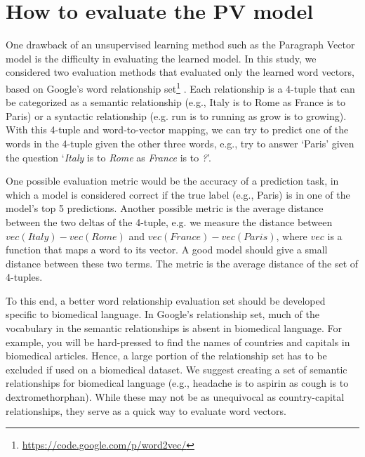 \documentclass{article}
\begin{document}
\section*{How to evaluate the PV model}

One drawback of an unsupervised learning method such as the Paragraph Vector model is the difficulty in evaluating the learned model. In this study, we considered two evaluation methods that evaluated only the learned word vectors, based on Google's word relationship set\footnote{\url{https://code.google.com/p/word2vec/}} \autocite{mikolov2013efficient}. Each relationship is a 4-tuple that can be categorized as a semantic relationship (e.g., Italy is to Rome as France is to Paris) or a syntactic relationship (e.g. run is to running as grow is to growing). With this 4-tuple and word-to-vector mapping, we can try to predict one of the words in the 4-tuple given the other three words, e.g., try to answer `Paris' given the question `{\it Italy} is to {\it Rome} as {\it France} is to {\it ?}'.

One possible evaluation metric would be the accuracy of a prediction task, in which a model is considered correct if the true label (e.g., Paris) is in one of the model's top 5 predictions.  Another possible metric is the average distance between the two deltas of the 4-tuple, e.g. we measure the distance between $vec(Italy) - vec(Rome)$ and $vec(France) - vec(Paris)$, where $vec$ is a function that maps a word to its vector.  A good model should give a small distance between these two terms. The metric is the average distance of the set of 4-tuples.

To this end, a better word relationship evaluation set should be developed specific to biomedical language. In Google's relationship set, much of the vocabulary in the semantic relationships is absent in biomedical language. For example, you will be hard-pressed to find the names of countries and capitals in biomedical articles. Hence, a large portion of the relationship set has to be excluded if used on a biomedical dataset. We suggest creating a set of semantic relationships for biomedical language (e.g., headache is to aspirin as cough is to dextromethorphan). While these may not be as unequivocal as country-capital relationships, they serve as a quick way to evaluate word vectors.
\end{document}
